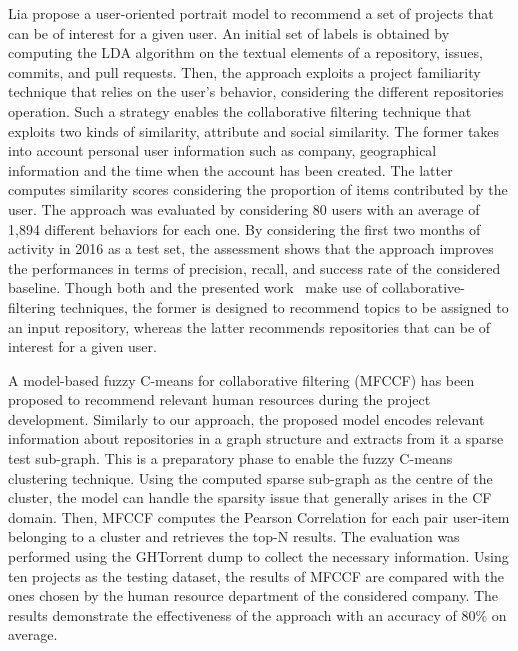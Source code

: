 Lia \etal \cite{liao_user_2018} propose a user-oriented portrait model to 
recommend a set of \GH projects that can be of interest for a given user. An 
initial set of labels is obtained by computing the LDA algorithm on the textual 
elements of a repository, \ie issues, commits, and pull requests. Then, the 
approach exploits a project familiarity technique that relies on the user's 
behavior, considering the different repositories operation. Such a strategy 
enables the collaborative filtering technique that exploits two kinds of 
similarity, \ie attribute and social similarity. The former takes into account personal user information such as company, geographical information 
and the time when the account has been created. The latter computes similarity scores considering the proportion of items contributed by the user. 
The approach was evaluated by considering 80 users with an average of 
1,894 different behaviors for each one. By considering the first two months of 
activity in 2016 as a test set, the assessment shows that the approach improves 
the performances in terms of precision, recall, and success rate of the 
considered baseline. Though both \TF and the presented work~\cite{liao_user_2018} make use of collaborative-filtering techniques, the 
former is designed to recommend topics to be assigned to an input \GH 
repository, whereas the latter recommends \GH repositories that can be of 
interest for a given user.


A model-based fuzzy C-means for collaborative filtering (MFCCF) has been 
proposed \cite{ajoudanian_recommending_2019} to recommend relevant human 
resources during the \GH project development. Similarly to our approach, the 
proposed model encodes relevant information about repositories in a graph 
structure and extracts from it a sparse test sub-graph. This is a 
preparatory phase to enable the fuzzy C-means clustering technique. Using the 
computed sparse sub-graph as the centre of the cluster, the model can handle 
the sparsity issue that generally arises in the CF domain. Then, MFCCF computes 
the Pearson Correlation for each pair user-item belonging to a cluster and 
retrieves the top-N results. The evaluation was performed using the GHTorrent 
dump to collect the necessary information. Using ten projects as the testing 
dataset, the results of MFCCF are compared with the ones chosen by the human 
resource department of the considered company. The results demonstrate the 
effectiveness of the approach with an accuracy of 80\% on average. 

